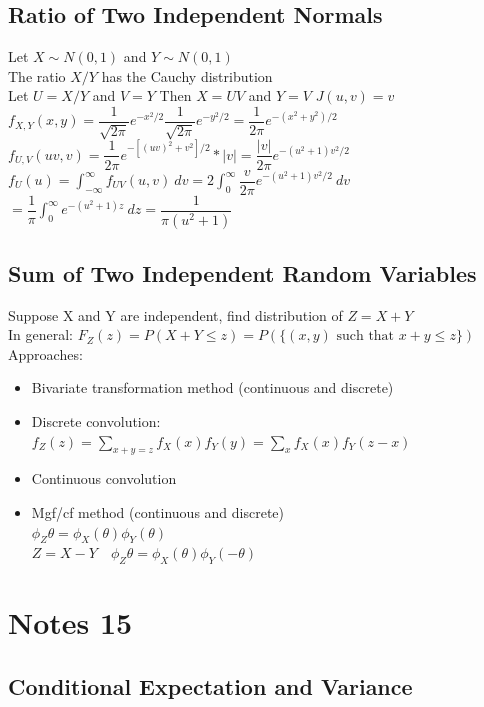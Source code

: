 \documentclass[openany]{book}
\begin{document}
\begin{flushleft}
\section{Ratio of Two Independent Normals}
Let $X \sim N(0,1)$ and $Y\sim N(0,1)$\\
The ratio $X/Y$ has the Cauchy distribution\\
Let $U=X/Y$ and $V=Y$ \quad Then $X=UV$ and $Y=V$ \quad $J(u,v)=v$\\
$f_{X,Y}(x,y)=\dfrac{1}{\sqrt{2\pi}}e^{-x^2/2}\dfrac{1}{\sqrt{2\pi}}e^{-y^2/2}=\dfrac{1}{2\pi}e^{-(x^2+y^2)/2}$\\
$f_{U,V}(uv,v)=\dfrac{1}{2\pi}e^{-[(uv)^2+v^2]/2}*|v|=\dfrac{|v|}{2\pi}e^{-(u^2+1)v^2/2}$\\
$f_{U}(u)=\int_{-\infty}^{\infty}f_{UV}(u,v) \ dv=2\int_{0}^{\infty}\dfrac{v}{2\pi}e^{-(u^2+1)v^2/2} \ dv$\\
$=\dfrac{1}{\pi}\int_{0}^{\infty}e^{-(u^2+1)z} \ dz=\dfrac{1}{\pi(u^2+1)}$
\section{Sum of Two Independent Random Variables}
Suppose X and Y are independent, find distribution of $Z=X+Y$\\
In general: $F_Z(z)=P(X+Y\leq z)=P(\{(x,y) \text{ such that } x+y\leq z\})$\\
Approaches:
\begin{itemize}
\item Bivariate transformation method (continuous and discrete)\\
\item Discrete convolution:\\
$f_Z(z)=\sum_{x+y=z}f_X(x)f_Y(y)=\sum_{x}f_X(x)f_Y(z-x)$\\
\item Continuous convolution\\
\item Mgf/cf method (continuous and discrete)\\
$\phi_Z{\theta}=\phi_X(\theta)\phi_Y(\theta)$\\
$Z=X-Y \quad \phi_Z{\theta}=\phi_X(\theta)\phi_Y(-\theta)$
\end{itemize}
\chapter{Notes 15}
\section{Conditional Expectation and Variance}

\end{flushleft}
\end{document}
